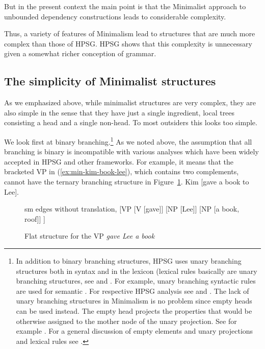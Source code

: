 \documentclass[output=paper]{langsci/langscibook}
\begin{document}
But in the present context the main point is that the Minimalist approach to unbounded dependency
constructions leads to considerable complexity.

Thus, a variety of features of Minimalism lead to structures that are much more complex than those of HPSG. HPSG shows that this complexity is unnecessary given a somewhat richer conception of grammar. 
\subsection{The simplicity of Minimalist structures}
\label{subsec:min-simplicity}

As we emphasized above, while minimalist structures are very complex, they are also simple in the sense that they have just a single ingredient, local trees consisting a head and a single non-head. To most outsiders this looks too simple.

We look first at binary branching.\footnote{
  In addition to binary branching structures, HPSG uses unary branching structures both in syntax
  and in the lexicon (lexical rules basically are unary branching structures, see
  \citet{Meurers2001a} and .
  For example, unary branching syntactic rules are used for semantic 
  \citep{Partee87a-u}. For respective HPSG analysis see  and
  . The lack of unary branching structures in Minimalism is
  no problem since empty heads can be used instead. The empty head projects the
  properties that would be otherwise assigned to the mother node of the unary projection. See for example \citep[]{Ramchand2005a}. For a
  general discussion of empty elements and unary projections and lexical rules see
  .
% 
} As we noted above, the assumption that all branching is binary is incompatible with various analyses which have been widely accepted in HPSG and other frameworks. For example, it means that the bracketed VP in (\ref{ex:min-kim-book-lee}), which contains two complements, cannot have the ternary branching structure in Figure~\ref{fig:gave-lee-book}.
\ea
Kim [gave a book to Lee].\label{ex:min-kim-book-lee}
\z
\begin{figure}
	\centering
	\begin{forest} sm edges without translation, 
		[VP
		[V [gave]] [NP [Lee]] [NP [a book, roof]]
		]
	\end{forest}
	\caption{\label{fig:gave-lee-book}Flat structure for the VP \emph{gave Lee a book}}
\end{figure}
\end{document}
